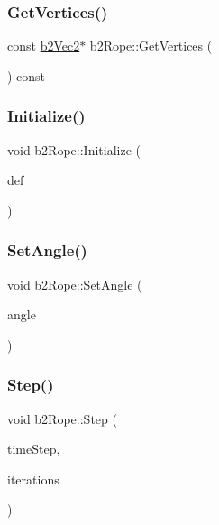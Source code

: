\mbox{\label{classb2_rope_acf2b433c741b90b3668ff4477b4a8319}} 
\subsubsection{\texorpdfstring{GetVertices()}{GetVertices()}}
{\footnotesize\ttfamily const \mbox{\hyperlink{structb2_vec2}{b2\+Vec2}}$\ast$ b2\+Rope\+::\+Get\+Vertices (\begin{DoxyParamCaption}{ }\end{DoxyParamCaption}) const\hspace{0.3cm}{\ttfamily [inline]}}

\mbox{\label{classb2_rope_a2a672ca3310790f4af1beb123e597d70}} 
\subsubsection{\texorpdfstring{Initialize()}{Initialize()}}
{\footnotesize\ttfamily void b2\+Rope\+::\+Initialize (\begin{DoxyParamCaption}\item[{const \mbox{\hyperlink{structb2_rope_def}{b2\+Rope\+Def}} $\ast$}]{def }\end{DoxyParamCaption})}

\mbox{\label{classb2_rope_a8a1717a5e0b2c54d56fe438c8cae43b7}} 
\subsubsection{\texorpdfstring{SetAngle()}{SetAngle()}}
{\footnotesize\ttfamily void b2\+Rope\+::\+Set\+Angle (\begin{DoxyParamCaption}\item[{\mbox{\hyperlink{b2_settings_8h_aacdc525d6f7bddb3ae95d5c311bd06a1}{float32}}}]{angle }\end{DoxyParamCaption})}

\mbox{\label{classb2_rope_abe9ce398cef717b136645cbc37f38d70}} 
\subsubsection{\texorpdfstring{Step()}{Step()}}
{\footnotesize\ttfamily void b2\+Rope\+::\+Step (\begin{DoxyParamCaption}\item[{\mbox{\hyperlink{b2_settings_8h_aacdc525d6f7bddb3ae95d5c311bd06a1}{float32}}}]{time\+Step,  }\item[{\mbox{\hyperlink{b2_settings_8h_a43d43196463bde49cb067f5c20ab8481}{int32}}}]{iterations }\end{DoxyParamCaption})}



